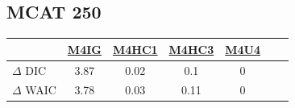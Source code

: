 \documentclass[ xcolor = pdftex, dvipsnames, table ]{beamer}
\begin{document}
\subsection{MCAT 250}
\begin{frame}{}
        \begin{table}[ht!]
        \centering
        \begin{tabular}[c]{@{}lcccccc@{}}
        \hline
        & \href{https://github.com/gasduster99/sppComp/tree/master/sscRuns/25019781982M4}{M4IG} & \href{https://github.com/gasduster99/sppComp/tree/master/sscRuns/25019781982M4HC1}{M4HC1} & \href{https://github.com/gasduster99/sppComp/tree/master/sscRuns/25019781982M4HC3}{M4HC3} & \href{https://github.com/gasduster99/sppComp/tree/master/sscRuns/25019781982M4U4}{M4U4} \\ \hline
        \(\Delta\) DIC & 3.87 & 0.02 & 0.1 & 0 \\                                         
	\(\Delta\) WAIC & 3.78 & 0.03 & 0.11 & 0 \\ \hline                                      
	\end{tabular}
        \end{table}
\end{frame}

%
%
\end{document}
